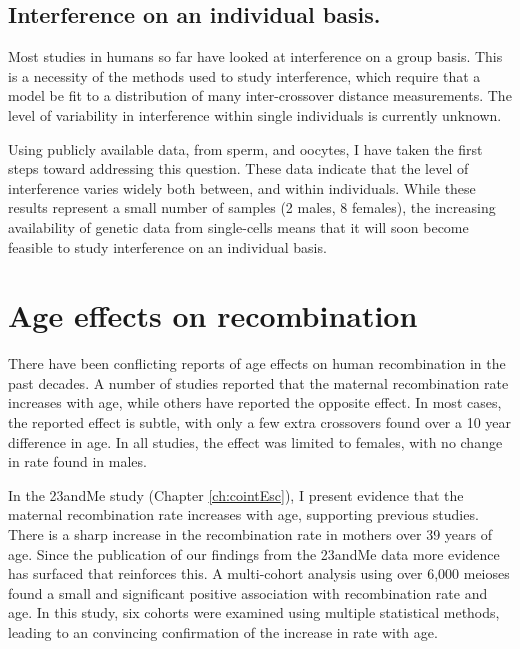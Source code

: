 \subsection{Interference on an individual basis.}

Most studies in humans so far have looked at interference on a group basis.
This is a necessity of the methods used to study interference, which require that a model be fit to a distribution of many inter-crossover distance measurements.
The level of variability in interference within single individuals is currently unknown.

Using publicly available data, from sperm\cite{Wang2012,Lu2012}, and oocytes\cite{Hou2013}, I have taken the first steps toward addressing this question.
These data indicate that the level of interference varies widely both between, and within individuals.
While these results represent a small number of samples (2 males, 8 females), the increasing availability of genetic data from single-cells means that it will soon become feasible to study interference on an individual basis.



\section{Age effects on recombination}


There have been conflicting reports of age effects on human recombination in the past decades.
A number of studies reported that the maternal recombination rate increases with age\cite{Kong2004,Coop2008}, while others have reported the opposite effect\cite{Hussin2011,Bleazard2013}.
In most cases, the reported effect is subtle, with only a few extra crossovers found over a 10 year difference in age.
In all studies, the effect was limited to females, with no change in rate found in males.

In the 23andMe study (Chapter \ref{ch:cointEsc}), I present evidence that the maternal recombination rate increases with age, supporting previous studies.
There is a sharp increase in the recombination rate in mothers over 39 years of age.
Since the publication of our findings from the 23andMe data more evidence has surfaced that reinforces this.
A multi-cohort analysis using over 6,000 meioses found a small and significant positive association with recombination rate and age\cite{Martin2015}.
In this study, six cohorts were examined using multiple statistical methods, leading to an convincing confirmation of the increase in rate with age.

